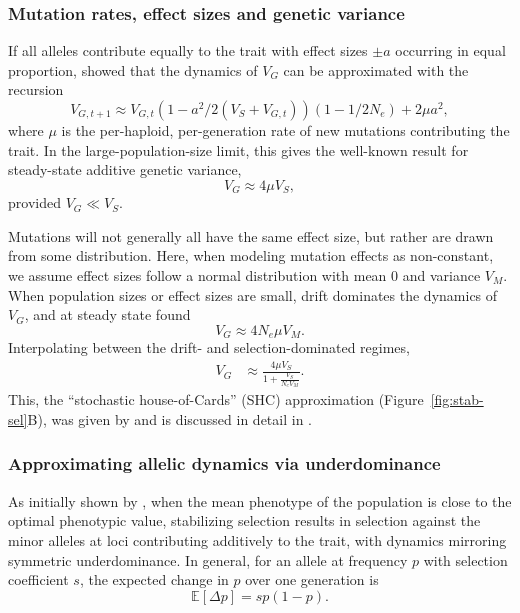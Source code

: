 \documentclass{article}
\newcommand{\E}{\mathbb{E}}
\begin{document}
\subsubsection*{Mutation rates, effect sizes and genetic variance}

If all alleles contribute equally to the trait
with effect sizes \(\pm a\) occurring in equal proportion,
\citet{keightley1988quantitative} showed that the dynamics of $V_G$ can be
approximated with the recursion
\[V_{G,t+1} \approx V_{G,t}\left(1-a^2/2(V_S+V_{G,t})\right)
\left(1-1/2N_e\right) + 2 \mu a^2,\]
where $\mu$ is the per-haploid, per-generation rate of new mutations
contributing the trait. In the
large-population-size limit, this gives the well-known result for
steady-state additive genetic variance,
\[V_G \approx 4\mu V_S,\] provided \(V_G \ll V_S\).

Mutations will not generally all have the same effect size, but rather are
drawn from some distribution. Here, when modeling mutation effects as
non-constant, we assume effect sizes follow a normal distribution with mean 0
and variance $V_M$. When population sizes or effect sizes are small, drift
dominates the dynamics of $V_G$, and at steady state \citet{lande1976natural}
found \[V_G \approx 4 N_e \mu V_M.\] Interpolating between the drift- and
selection-dominated regimes,
\begin{align}\label{eq:SHC}
    V_G & \approx \frac{4 \mu V_S}{1 + \frac{V_S}{N_e V_M}}.
\end{align}
This, the ``stochastic
house-of-Cards'' (SHC) approximation (Figure~\ref{fig:stab-sel}B), was given by
\citet{burger1989much} and is discussed in detail in \citet[][Ch.
28]{walsh2018evolution}.

\subsubsection*{Approximating allelic dynamics via underdominance}

As initially shown by \citet{robertson1956effect} \citep[see
also,][]{keightley1988quantitative, simons2018population}, when the mean
phenotype of the population is close to the optimal phenotypic value,
stabilizing selection results in selection against the minor alleles at loci
contributing additively to the trait, with dynamics mirroring symmetric
underdominance. In general, for an allele at frequency $p$ with selection
coefficient $s$, the expected change in $p$ over one generation is
\begin{equation}
    \E[\Delta p] = sp(1-p).
\end{equation}
\end{document}
